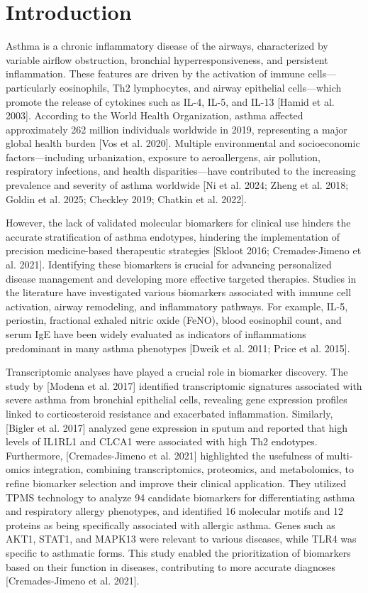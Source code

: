 
\section{Introduction}

Asthma is a chronic inflammatory disease of the airways, characterized by variable airflow obstruction, bronchial hyperresponsiveness, and persistent inflammation. These features are driven by the activation of immune cells—particularly eosinophils, Th2 lymphocytes, and airway epithelial cells—which promote the release of cytokines such as IL-4, IL-5, and IL-13 [Hamid et al. 2003]. According to the World Health Organization, asthma affected approximately 262 million individuals worldwide in 2019, representing a major global health burden [Vos et al. 2020]. Multiple environmental and socioeconomic factors—including urbanization, exposure to aeroallergens, air pollution, respiratory infections, and health disparities—have contributed to the increasing prevalence and severity of asthma worldwide [Ni et al. 2024; Zheng et al. 2018; Goldin et al. 2025; Checkley 2019; Chatkin et al. 2022].

However, the lack of validated molecular biomarkers for clinical use hinders the accurate stratification of asthma endotypes, hindering the implementation of precision medicine-based therapeutic strategies [Skloot 2016; Cremades-Jimeno et al. 2021]. Identifying these biomarkers is crucial for advancing personalized disease management and developing more effective targeted therapies. Studies in the literature have investigated various biomarkers associated with immune cell activation, airway remodeling, and inflammatory pathways. For example, IL-5, periostin, fractional exhaled nitric oxide (FeNO), blood eosinophil count, and serum IgE have been widely evaluated as indicators of inflammations predominant in many asthma phenotypes [Dweik et al. 2011; Price et al. 2015].

Transcriptomic analyses have played a crucial role in biomarker discovery. The study by [Modena et al. 2017] identified transcriptomic signatures associated with severe asthma from bronchial epithelial cells, revealing gene expression profiles linked to corticosteroid resistance and exacerbated inflammation. Similarly, [Bigler et al. 2017] analyzed gene expression in sputum and reported that high levels of IL1RL1 and CLCA1 were associated with high Th2 endotypes. Furthermore, [Cremades-Jimeno et al. 2021] highlighted the usefulness of multi-omics integration, combining transcriptomics, proteomics, and metabolomics, to refine biomarker selection and improve their clinical application. They utilized TPMS technology to analyze 94 candidate biomarkers for differentiating asthma and respiratory allergy phenotypes, and identified 16 molecular motifs and 12 proteins as being specifically associated with allergic asthma. Genes such as AKT1, STAT1, and MAPK13 were relevant to various diseases, while TLR4 was specific to asthmatic forms. This study enabled the prioritization of biomarkers based on their function in diseases, contributing to more accurate diagnoses [Cremades-Jimeno et al. 2021].

